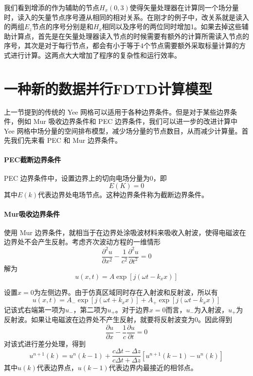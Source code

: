 我们看到增添的作为辅助的节点$H_x(0,3)$使得矢量处理器在计算同一个场分量时，读入的矢量节点序号遵从相同的相对关系。在刚才的例子中，改关系就是读入的两组$E_z$节点的序号分别是和$H_x$相同以及序号的两位同时增加1。如果去掉这些辅助计算点，首先是在矢量处理器读入节点的时候需要有额外的计算所需读入节点的序号，其次是对于每行节点，都会有小于等于4个节点需要额外采取标量计算的方式进行计算。这两点大大增加了程序的复杂性和运行效率。

\section{一种新的数据并行FDTD计算模型}

上一节提到的传统的 Yee 网格可以适用于各种边界条件。但是对于某些边界条件，例如 Mur 吸收边界条件和 PEC 边界条件，我们可以进一步的改进计算中 Yee 网格中场分量的空间排布模型，减少场分量的节点数目，从而减少计算量。首先我们先来看 PEC 和 Mur 边界条件。

\paragraph{PEC截断边界条件} PEC 边界条件中，设置边界上的切向电场分量为0，即
\begin{equation}\label{ch3: pec}
E(K)=0
\end{equation}
其中$E(k)$代表边界处电场节点。这种边界条件称为截断边界条件。

\paragraph{Mur吸收边界条件} 使用 Mur 边界条件，就相当于在边界处涂吸波材料来吸收入射波，使得电磁波在边界处不会产生反射。考虑齐次波动方程的一维情形
\begin{equation}
\frac{\partial^2 u}{\partial x^2}-\frac{1}{c^2}\frac{\partial^2 u}{\partial t^2}=0
\end{equation}
解为
\begin{equation}
u(x,t)=A\exp[j(\omega t-k_x x)]
\end{equation}

设置$x=0$为左侧边界。由于仿真区域同时存在入射波和反射波，所以有
\begin{equation}
u(x,t)=A_{-}\exp[j(\omega t+k_x x)]+A_{+}\exp[j(\omega t-k_x x)]
\end{equation}
记该式右端第一项为$u_{-}$，第二项为$u_{+}$。对于边界$x=0$而言，$u_{-}$为入射波，$u_{+}$为反射波。如果让电磁波在边界处不产生反射，就要将反射波变为0。因此得到
\begin{equation}
\frac{\partial u}{\partial x}-\frac{1}{c}\frac{\partial u}{\partial t}=0
\end{equation}
对该式进行差分处理，得到
\begin{equation}\label{ch3: mur}
u^{n+1}(k)=u^n(k-1)+\frac{c\Delta t-\Delta z}{c\Delta t+\Delta z}[u^{n+1}(k-1)-u^n(k)]
\end{equation}
其中$u(k)$代表边界点，$u(k-1)$代表边界内最接近的相邻点。

